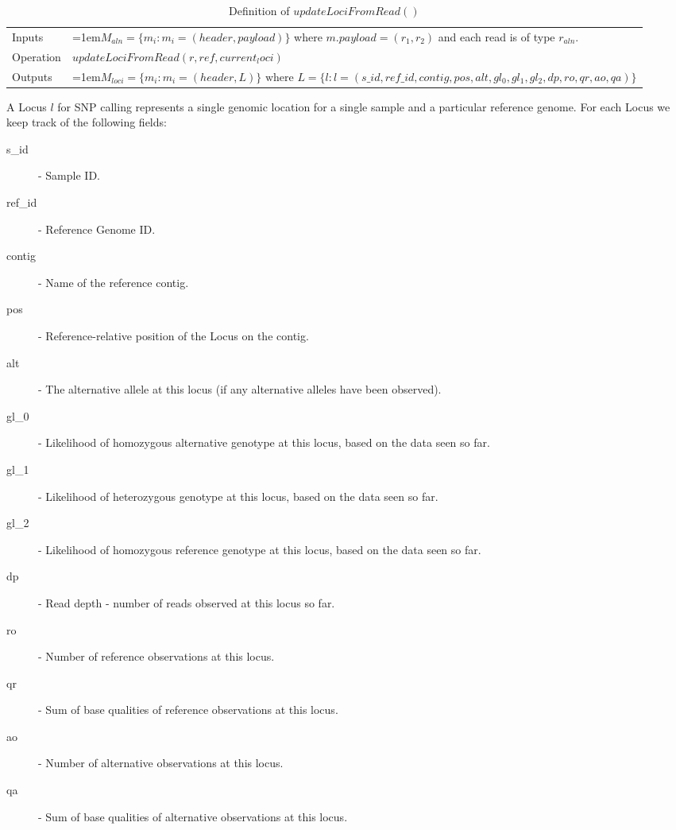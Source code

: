 \bgroup
\def\arraystretch{1.5}
\begin{table}[!ht]
    \caption{Definition of $updateLociFromRead()$}
    \label{tab:op_update_loci_from_read}
    {\begin{tabular}{l|p{12cm}}
    \toprule
    Inputs & \hangindent=1em$M_{aln} = \{m_i: m_i = (header, payload)\}$ where $m.payload = (r_1,r_2)$ and each read is of type $r_{aln}$. \\
    \cline{2-2}
    Operation & $updateLociFromRead(r, ref, current_loci)$\\
    \cline{2-2}
    Outputs & \hangindent=1em$M_{loci} = \{m_i: m_i = (header, L)\} \text{ where } L = \{l : l=(s\_id, ref\_id, contig, pos, alt, gl_0, gl_1, gl_2, dp, ro, qr, ao, qa)\}$\\
    \bottomrule
    \end{tabular}}
\end{table}
\egroup

A Locus $l$ for SNP calling represents a single genomic location for a single sample and a particular reference genome. For each Locus we keep track of the following fields:

\begin{description}
    \item[s\_id] - Sample ID.
    \item[ref\_id] - Reference Genome ID.
    \item[contig] - Name of the reference contig.
    \item[pos] - Reference-relative position of the Locus on the contig.
    \item[alt] - The alternative allele at this locus (if any alternative alleles have been observed).
    \item[gl\_0] - Likelihood of homozygous alternative genotype at this locus, based on the data seen so far.
    \item[gl\_1] - Likelihood of heterozygous genotype at this locus, based on the data seen so far.
    \item[gl\_2] - Likelihood of homozygous reference genotype at this locus, based on the data seen so far.
    \item[dp] - Read depth - number of reads observed at this locus so far.
    \item[ro] - Number of reference observations at this locus.
    \item[qr] - Sum of base qualities of reference observations at this locus.
    \item[ao] - Number of alternative observations at this locus.
    \item[qa] - Sum of base qualities of alternative observations at this locus.       
\end{description}

